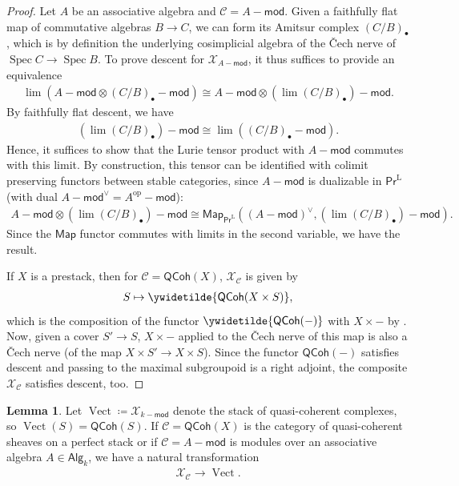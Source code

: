 \documentclass{article}
\numberwithin{equation}{section}
\theoremstyle{quest}
\theoremstyle{definition}
\newtheorem{lem}[thm]{Lemma}
\theoremstyle{remark}
\newcommand{\msf}{\mathsf}
\newcommand{\Mod}{-\msf{mod}}
\DeclareMathOperator{\Spec}{Spec}
\DeclareMathOperator{\Vect}{Vect}
\begin{document}
\begin{proof}
Let $A$ be an associative algebra and $\mathcal{C}=A\Mod$. Given a faithfully flat map of commutative algebras $B\to C$, we can form its Amitsur complex $(C /B)_\bullet$, which is by definition the underlying cosimplicial algebra of the \v{C}ech nerve of $\Spec C \to \Spec B$. To prove descent for $\mathcal{X}_{A\Mod}$, it thus suffices to provide an equivalence
\begin{align*}
	\lim(A\Mod\otimes (C/B)_\bullet\Mod)\cong A\Mod \otimes (\lim(C /B)_\bullet)\Mod.
\end{align*} 
By faithfully flat descent, we have
\begin{align*}
	(\lim(C /B)_\bullet)\Mod\cong \lim((C /B)_\bullet\Mod).
\end{align*} 
Hence, it suffices to show that the Lurie tensor product with $A\Mod$ commutes with this limit. By construction, this tensor can be identified with colimit preserving functors between stable categories, since $A\Mod$ is dualizable in $\mathsf{Pr}^\text{L}$ (with dual $A\Mod^\vee=A^{\text{op}}\Mod$):
\begin{align*}
	A\Mod\otimes (\lim(C /B)_\bullet)\Mod\cong \mathsf{Map}_{\mathsf{Pr}^\text{L}}((A\Mod)^\vee,(\lim(C /B)_\bullet)\Mod).
\end{align*} 
Since the $\mathsf{Map}$ functor commutes with limits in the second variable, we have the result.

If $X$ is a prestack, then for $\mathcal{C}=\mathsf{QCoh}(X)$, $\mathcal{X}_{\mathcal{C}}$ is given by
\begin{align*}
	S\mapsto \ywidetilde{\mathsf{QCoh}(X\times S)},
\end{align*} 
which is the composition of the functor $\ywidetilde{\mathsf{QCoh}(-)}$ with $X\times -$ by \cite[Chapter 3 Proposition 3.5.3]{GR}. Now, given a cover $S'\to S$, $X\times -$ applied to the \v{C}ech nerve of this map is also a \v{C}ech nerve (of the map $X\times S'\to X\times S$). Since the functor $\mathsf{QCoh}(-)$ satisfies descent and passing to the maximal subgroupoid is a right adjoint, the composite $\mathcal{X}_{\mathcal{C}}$ satisfies descent, too.
\end{proof} 
\begin{lem}\label{lem:perf-pushforward}
	Let $\Vect\coloneqq \mathcal{X}_{k\Mod}$ denote the stack of quasi-coherent complexes, so $\Vect(S)=\mathsf{QCoh}(S)$. If $\mathcal{C}=\mathsf{QCoh}(X)$ is the category of quasi-coherent sheaves on a perfect stack or if $\mathcal{C}=A\Mod$ is modules over an associative algebra $A\in \mathsf{Alg}_k$, we have a natural transformation
\begin{align*}
	\mathcal{X}_{\mathcal{C}}\to \Vect.
\end{align*} 
\end{lem} 
\end{document}
